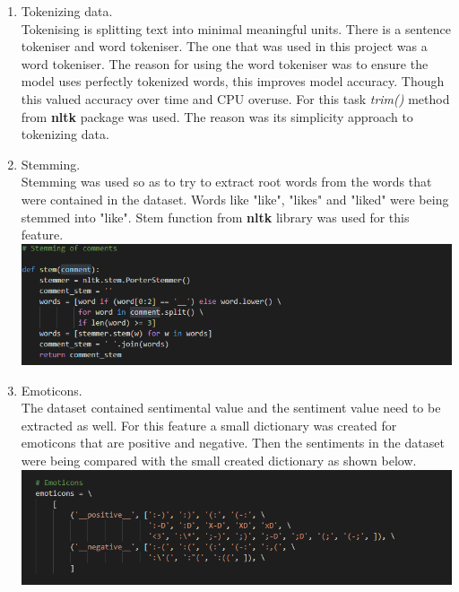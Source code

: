 \documentclass[12pt]{report}
\begin{document}
\begin{enumerate}
		\item Tokenizing data.\\
		Tokenising is splitting text into minimal meaningful units. There is a sentence tokeniser and word tokeniser. The one that was used in this project was a word tokeniser. The reason for using the word tokeniser was to ensure the model uses perfectly tokenized words, this improves model accuracy. Though this valued accuracy over time and CPU overuse. For this task \textit{trim()} method from \textbf{nltk} package was used. The reason was its simplicity approach to tokenizing data.\\
		
		\item Stemming.\\
		Stemming was used so as to try to extract root words from the words that were contained in the dataset. Words like "like", "likes" and "liked" were being stemmed into "like". Stem function from \textbf{nltk} library was used for this feature.\\
		
		\includegraphics[scale=0.5]{stemming.PNG}
		
		\item Emoticons.\\
		The dataset contained sentimental value and the sentiment value need to be extracted as well. For this feature a small dictionary was created for emoticons that are positive and negative. Then the sentiments in the dataset were being compared with the small created dictionary as shown below.\\
		
		\includegraphics[scale=0.5]{emoticons.PNG}
		
	\end{enumerate}
	
\end{document}
